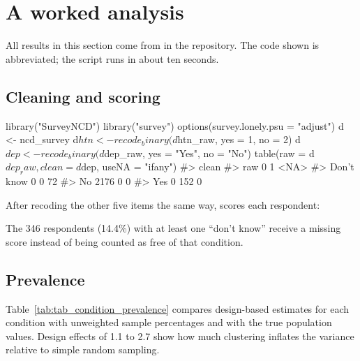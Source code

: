 

\section{A worked analysis}

All results in this section come from  in the repository. The code shown is abbreviated; the script runs in about ten seconds.

\subsection{Cleaning and scoring}

\begin{example}
library("SurveyNCD")
library("survey")
options(survey.lonely.psu = "adjust")
d <- ncd_survey
d$htn <- recode_binary(d$htn_raw, yes = 1, no = 2)
d$dep <- recode_binary(d$dep_raw, yes = "Yes", no = "No")
table(raw = d$dep_raw, clean = d$dep, useNA = "ifany")
#>             clean
#> raw             0    1 <NA>
#>   Don't know    0    0   72
#>   No         2176    0    0
#>   Yes           0  152    0
\end{example}

After recoding the other five items the same way,  scores each respondent:


The 346 respondents (14.4\%) with at least one ``don't know'' receive a missing score instead of being counted as free of that condition.

\subsection{Prevalence}

Table~\ref{tab:tab_condition_prevalence} compares design-based estimates for each condition with unweighted sample percentages and with the true population values. Design effects of 1.1 to 2.7 show how much clustering inflates the variance relative to simple random sampling.

